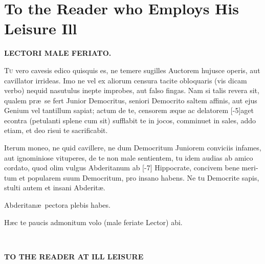 \chapter{To the Reader who Employs His Leisure Ill}

\noindent\textbf{LECTORI MALE FERIATO.}

\begin{latin}
\lettrine{T}{u} vero cavesis edico quisquis es, ne temere sugilles Auctorem hujusce
operis, aut cavillator irrideas. Imo ne vel ex aliorum censura tacite
obloquaris (vis dicam verbo) nequid nasutulus inepte improbes, aut
falso fingas. Nam si talis revera sit, qualem pr\ae{}\ se fert Junior
Democritus, seniori Democrito saltem affinis, aut ejus Genium vel
  tantillum sapiat; actum de te, censorem \ae{}que ac delatorem [-5\baselineskip]aget
econtra (petulanti splene cum sit) sufflabit te in jocos, comminuet in
sales, addo etiam, et deo risui te sacrificabit.

Iterum moneo, ne quid cavillere, ne dum Democritum Juniorem conviciis
infames, aut ignominiose vituperes, de te non male sentientem, tu idem
  audias ab amico cordato, quod olim vulgus Abderitanum ab [-7\baselineskip]
Hippocrate, concivem bene meritum et popularem suum Democritum, pro
insano habens. Ne tu Democrite sapis, stulti autem et insani Abderit\ae{}.

Abderitan\ae{}\ pectora plebis habes.

H\ae{}c te paucis admonitum volo (male feriate Lector) abi.
\end{latin}

\begin{center}
{\Huge{}\color{maroon}}\par
\end{center}

\noindent\textbf{TO THE READER AT ILL LEISURE}

